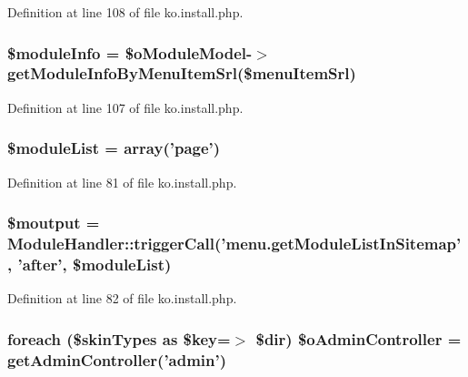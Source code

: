 Definition at line 108 of file ko.\+install.\+php.

\hypertarget{ko_8install_8php_ae3552a6dd49f37a50e7858151f7c5cc2}{
\subsubsection[{\$module\+Info}]{\setlength{\rightskip}{0pt plus 5cm}\$module\+Info = \$o\+Module\+Model-\/$>$get\+Module\+Info\+By\+Menu\+Item\+Srl(\$menu\+Item\+Srl)}}\label{ko_8install_8php_ae3552a6dd49f37a50e7858151f7c5cc2}


Definition at line 107 of file ko.\+install.\+php.

\hypertarget{ko_8install_8php_aaa80946d50e2d3677fbbc6d6c8a643c3}{
\subsubsection[{\$module\+List}]{\setlength{\rightskip}{0pt plus 5cm}\$module\+List = array('{\bf page}')}}\label{ko_8install_8php_aaa80946d50e2d3677fbbc6d6c8a643c3}


Definition at line 81 of file ko.\+install.\+php.

\hypertarget{ko_8install_8php_a2598d068355cca17645bc6bd70cc3a8c}{
\subsubsection[{\$moutput}]{\setlength{\rightskip}{0pt plus 5cm}\$moutput = {\bf Module\+Handler\+::trigger\+Call}('menu.\+get\+Module\+List\+In\+Sitemap', 'after', \$module\+List)}}\label{ko_8install_8php_a2598d068355cca17645bc6bd70cc3a8c}


Definition at line 82 of file ko.\+install.\+php.

\hypertarget{ko_8install_8php_a4e2098076e50f24dd86e1062844d25d5}{
\subsubsection[{\$o\+Admin\+Controller}]{\setlength{\rightskip}{0pt plus 5cm}foreach (\$skin\+Types as \$key=$>$ \$dir) \$o\+Admin\+Controller = {\bf get\+Admin\+Controller}('{\bf admin}')}}\label{ko_8install_8php_a4e2098076e50f24dd86e1062844d25d5}



